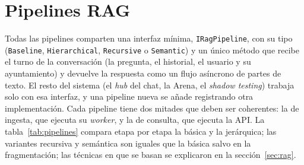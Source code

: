 \section{Pipelines RAG}
\label{sec:pipelines}

Todas las pipelines comparten una interfaz mínima, \texttt{IRagPipeline}, con su tipo (\texttt{Baseline}, \texttt{Hierarchical}, \texttt{Recursive} o \texttt{Semantic}) y un único método que recibe el turno de la conversación (la pregunta, el historial, el usuario y su ayuntamiento) y devuelve la respuesta como un flujo asíncrono de partes de texto. El resto del sistema (el \emph{hub} del chat, la Arena, el \emph{shadow testing}) trabaja solo con esa interfaz, y una pipeline nueva se añade registrando otra implementación. Cada pipeline tiene dos mitades que deben ser coherentes: la de ingesta, que ejecuta su \emph{worker}, y la de consulta, que ejecuta la API. La tabla~\ref{tab:pipelines} compara etapa por etapa la básica y la jerárquica; las variantes recursiva y semántica son iguales que la básica salvo en la fragmentación; las técnicas en que se basan se explicaron en la sección~\ref{sec:rag}.

